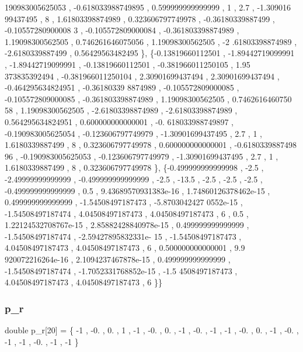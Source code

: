\begin{DoxyCode}
      190983005625053 , -0.618033988749895 , 0.599999999999999 ,                 1 ,               2.7 , -1.309016
      99437495 ,                 8 ,  1.61803398874989 , 0.323606797749978 , -0.36180339887499 , -0.10557280900008
      3 , -0.105572809000084 , -0.361803398874989 ,  1.19098300562505 , 0.746261646075056 ,  1.19098300562505 , -2
      .61803398874989 ,  -2.6180339887499 ,  0.56429563482495 \},
\{-0.13819660112501 , -1.89442719099991 , -1.89442719099991 , -0.13819660112501 , -0.381966011250105 ,  1.95
      373835392494 , -0.381966011250104 ,  2.30901699437494 ,  2.30901699437494 , -0.464295634824951 , -0.36180339
      8874989 , -0.105572809000085 , -0.105572809000085 , -0.361803398874989 ,  1.19098300562505 , 0.7462616460750
      58 ,  1.19098300562505 , -2.61803398874989 , -2.61803398874989 , 0.564295634824951 , 0.600000000000001 , -0.
      618033988749897 , -0.190983005625054 , -0.123606797749979 , -1.30901699437495 ,               2.7 ,         
              1 ,   1.6180339887499 ,                 8 , 0.323606797749978 , 0.600000000000001 , -0.6180339887498
      96 , -0.190983005625053 , -0.123606797749979 , -1.30901699437495 ,               2.7 ,                 1 ,  
       1.6180339887499 ,                 8 , 0.323606797749978 \},
\{-0.499999999999998 ,              -2.5 , -2.49999999999999 , -0.499999999999999 ,              -2.5 ,     
              -13.5 ,              -2.5 ,              -2.5 ,              -2.5 , -0.499999999999999 ,            
         0.5 , 9.43689570931383e-16 , 1.74860126378462e-15 , 0.499999999999999 , -1.54508497187473 , -5.8703042427
      0552e-15 , -1.54508497187474 ,  4.04508497187473 ,  4.04508497187473 ,                 6 ,               0.5
       , 1.22124532708767e-15 , 2.85882428840978e-15 , 0.499999999999999 , -1.54508497187474 , -2.59427895832331e-
      15 , -1.54508497187473 ,  4.04508497187473 ,  4.04508497187473 ,                 6 , 0.500000000000001 , 9.9
      920072216264e-16 , 2.1094237467878e-15 , 0.499999999999999 , -1.54508497187474 , -1.7052331768852e-15 , -1.5
      4508497187473 ,  4.04508497187473 ,  4.04508497187473 ,                 6 \}\}
\end{DoxyCode}
\mbox{\label{a00485_af78edd19bf59dc74c169fb10b5074e12}} 
\subsubsection{\texorpdfstring{p\+\_\+r}{p\_r}}
{\footnotesize\ttfamily double p\+\_\+r\mbox{[}20\mbox{]} = \{ -\/1 , -\/0. , 0. , 1 , -\/1 , -\/0. , 0. , -\/1 , -\/0. , -\/1 , -\/1 , -\/0. , 0. , -\/1 , -\/0. , -\/1 , -\/1 , -\/0. , -\/1 , -\/1 \}}


